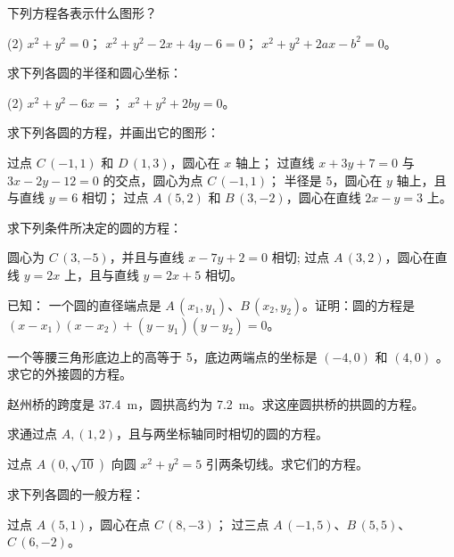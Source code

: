 \begin{Practice}
  \begin{question}
    \item 下列方程各表示什么图形？
    \begin{tasks}(2)
      \task $x^2+y^2=0$；
      \task $x^2+y^2-2x+4y-6=0$；
      \task $x^2+y^2+2ax-b^2=0$。
    \end{tasks}
    \item 求下列各圆的半径和圆心坐标：
    \begin{tasks}(2)
      \task $x^2+y^2-6x=$；
      \task $x^2+y^2+2by=0$。
    \end{tasks}
  \end{question}
\end{Practice}

\begin{Exercise}
  \begin{question}
    \item 求下列各圆的方程，并画出它的图形：
    \begin{tasks}
      \task 过点 $C\,(-1,1)$ 和 $D\,(1,3)$，圆心在 $x$ 轴上；
      \task 过直线 $x+3y+7=0$ 与 $3x-2y-12=0$ 的交点，圆心为点 $C\,(-1,1)$；
      \task 半径是 5，圆心在 $y$ 轴上，且与直线 $y=6$ 相切；
      \task 过点 $A\,(5,2)$ 和 $B\,(3,-2)$，圆心在直线 $2x-y=3$ 上。
    \end{tasks}
    \item 求下列条件所决定的圆的方程：
    \begin{tasks}
      \task 圆心为 $C\,(3,-5)$，并且与直线 $x-7y+2=0$ 相切;
      \task 过点 $A\,(3,2)$，圆心在直线 $y=2x$ 上，且与直线 $y=2x+5$ 相切。
    \end{tasks}
    \item 已知： 一个圆的直径端点是 $A\,(x_1,y_1)$、$B\,(x_2,y_2)$。证明：圆的方程是 $(x-x_1)(x-x_2)+(y-y_1)(y-y_2)=0$。
    \item 一个等腰三角形底边上的高等于 5，底边两端点的坐标是 $(-4,0)$ 和 $(4,0)$ 。求它的外接圆的方程。
    \item 赵州桥的跨度是 \qty{37.4}{m}，圆拱高约为 \qty{7.2}{m}。求这座圆拱桥的拱圆的方程。
    \item 求通过点 $A,(1,2)$，且与两坐标轴同时相切的圆的方程。
    \item 过点 $A\,(0,\sqrt{10})$ 向圆 $x^2+y^2=5$ 引两条切线。求它们的方程。
    \item 求下列各圆的一般方程：
    \begin{tasks}
      \task 过点 $A\,(5,1)$，圆心在点 $C\,(8,-3)$；
      \task 过三点 $A\,(-1,5)$、$B\,(5,5)$、$C\,(6,-2)$。

\end{tasks}
\end{question}
\end{Exercise}
